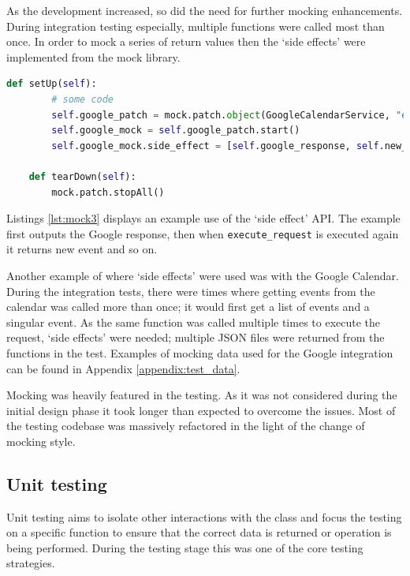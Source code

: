 As the development increased, so did the need for further mocking enhancements. During integration testing especially, multiple functions were called most than once. In order to mock a series of return values then the `side effects' were implemented from the mock library.

\begin{lstlisting}[language=python, label={lst:mock3}, breaklines, columns=fullflexible, keywordstyle=\color{blue}, basicstyle=\normalsize\ttfamily, caption={The refactored solution to use patch calls instead.}]
    def setUp(self):
        # some code
        self.google_patch = mock.patch.object(GoogleCalendarService, "execute_request")
        self.google_mock = self.google_patch.start()
        self.google_mock.side_effect = [self.google_response, self.new_event, self.google_response, self.updated_response]

    def tearDown(self):
        mock.patch.stopAll()
\end{lstlisting}

Listings \ref{lst:mock3} displays an example use of the `side effect' API. The example first outputs the Google response, then when \texttt{execute\_request} is executed again it returns new event and so on.

Another example of where `side effects' were used was with the Google Calendar. During the integration tests, there were times where getting events from the calendar was called more than once; it would first get a list of events and a singular event. As the same function was called multiple times to execute the request, `side effects' were needed; multiple JSON files were returned from the functions in the test. Examples of mocking data used for the Google integration can be found in Appendix \ref{appendix:test_data}.

Mocking was heavily featured in the testing. As it was not considered during the initial design phase it took longer than expected to overcome the issues. Most of the testing codebase was massively refactored in the light of the change of mocking style.

\subsection{Unit testing}
Unit testing aims to isolate other interactions with the class and focus the testing on a specific function to ensure that the correct data is returned or operation is being performed. During the testing stage this was one of the core testing strategies.

